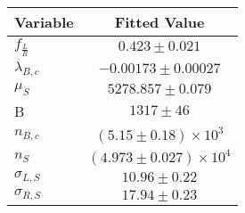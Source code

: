 \begin{tabular}[t]{lc}
\hline
Variable &Fitted Value\\
\hline\hline
$f_{\frac{L}{R}}$&$0.423\pm0.021$\\
\hline
$\lambda_{B,c}$&$-0.00173\pm0.00027$\\
\hline
$\mu_S$&$5278.857\pm0.079$\\
\hline
B&$1317\pm46$\\
\hline
$n_{B,c}$&$(5.15\pm0.18)\times 10^3$\\
\hline
$n_S$&$(4.973\pm0.027)\times 10^4$\\
\hline
$\sigma_{L, S}$&$10.96\pm0.22$\\
\hline
$\sigma_{R, S}$&$17.94\pm0.23$\\
\hline
\end{tabular}